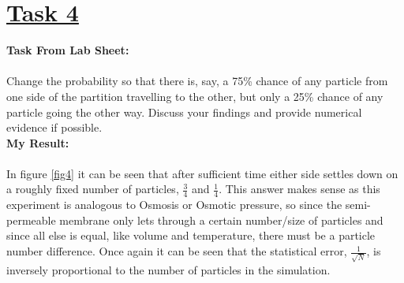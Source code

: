 \documentclass[12pt, A4]{article}
\begin{document}
\section*{\underline{Task 4}}

\textbf{Task From Lab Sheet:} \\ \\ Change the probability so that there is, say, a 75\% chance of any particle from one side of the partition travelling to the other, but only a 25\% chance of any particle going the other way. Discuss your findings and provide numerical evidence if possible.
\vspace{1.5em}\\
\textbf{My Result:} \\ \\ In figure \ref{fig4} it can be seen that after sufficient time either side settles down on a roughly fixed number of particles, $\frac{3}{4}$ and $\frac{1}{4}$. 
This answer makes sense as this experiment is analogous to Osmosis or Osmotic pressure, so since the semi-permeable membrane only lets through a certain number/size of particles and since all else is equal, like volume and temperature, there must be a particle number difference. 
Once again it can be seen that the statistical error, $\frac{1}{\sqrt{N}}$, is inversely proportional to the number of particles in the simulation.
\end{document}
